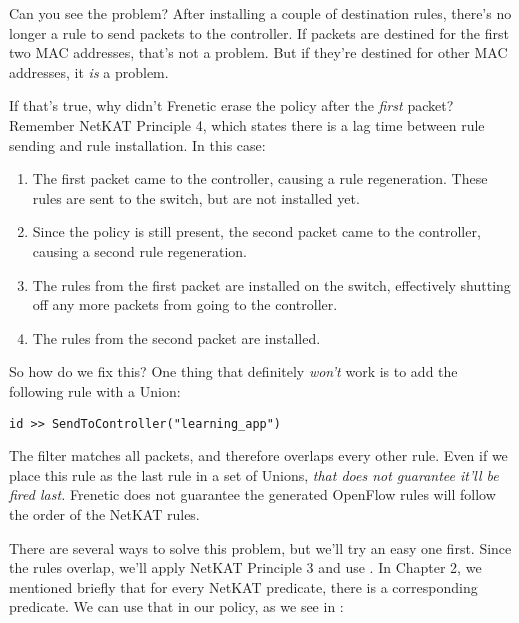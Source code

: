 Can you see the problem?  
After installing a couple of destination rules,
there's no longer a rule to send packets to the controller.  If packets
are destined for the first two MAC addresses, that's not a problem.  But if they're destined for
other MAC addresses, it \emph{is} a problem.

If that's true, why didn't Frenetic erase the  policy 
after the \emph{first} packet?  Remember NetKAT Principle 4, which 
states there is a lag time between rule sending and rule installation.  In this case:

\begin{enumerate}
\item The first packet came to the controller, causing a rule regeneration.  These rules
are sent to the switch, but are not installed yet.
\item Since the  policy is still present, the second packet came to the controller, causing a second rule regeneration.
\item The rules from the first packet are installed on the switch, effectively shutting off 
any more packets from going to the controller.
\item The rules from the second packet are installed.  
\end{enumerate}

So how do we fix this?
One thing that definitely \emph{won't} work is to add the following rule with a Union:

\begin{verbatim}
id >> SendToController("learning_app")
\end{verbatim}

The  filter matches all packets, and therefore overlaps every other rule.  Even if we place this
rule as the last rule in a set of Unions, \emph{that does not guarantee it'll be fired last.}  Frenetic 
does not guarantee the generated OpenFlow rules will follow the order of the NetKAT rules.     

There are several ways to solve this problem, but we'll try an easy one first.  
Since the rules overlap, we'll apply NetKAT Principle 3 and use .
In Chapter 2, we mentioned briefly that for every  NetKAT predicate, there is a corresponding
 predicate.  We can use that in our policy, as we see in :

\inputminted[firstline=30,lastline=37]{python}{code/l2_learning_switch/learning3.py}

